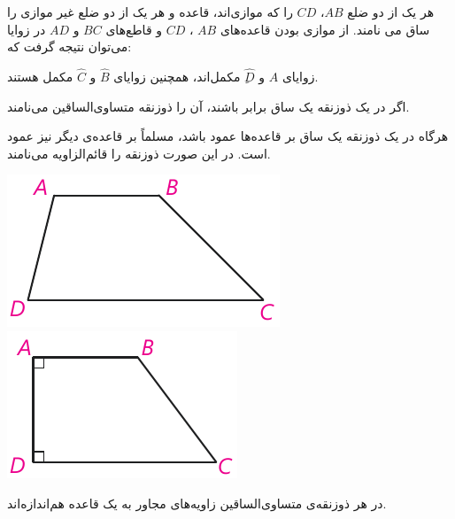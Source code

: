\documentclass[12pt, a4paper]{book}
\begin{document}
\begin{minipage}{.67\textwidth}

هر یک از دو ضلع $AB$، $CD$ را که موازی‌اند،
 {\medium قاعده} و هر یک از دو ضلع غیر موازی را {\medium ساق} می نامند. از موازی بودن قاعده‌های $AB$ ، $CD$ و قاطع‌های $BC$ و $AD$ در زوایا می‌توان نتیجه گرفت که:
\newline

زوایای $ \widehat{A}$ و $ \widehat{ِD}$ مکمل‌اند، همچنین زوایای  $ \widehat{B}$ و $ \widehat{C}$ مکمل هستند.
\newline

اگر در یک ذوزنقه یک ساق برابر باشند، آن را ذوزنقه متساوی‌الساقین می‌نامند.
\newline

هرگاه در یک ذوزنقه یک ساق بر قاعده‌ها عمود باشد، مسلماً بر قاعده‌ی دیگر نیز عمود است. در این صورت ذوزنقه را قائم‌الزاویه می‌نامند.
\end{minipage}
\begin{minipage}{.3\textwidth}
	\begin{flushleft}
		\includegraphics{"Shapes/Fasl - 3/Dars 1/2-4.1.pdf"}
		\includegraphics{"Shapes/Fasl - 3/Dars 1/2-4.2.pdf"}
	\end{flushleft}
\end{minipage}

در هر ذوزنقه‌ی متساوی‌الساقین زاویه‌های مجاور به یک قاعده هم‌اندازه‌اند.
\end{document}
